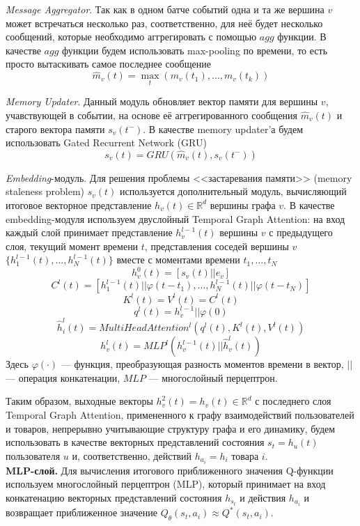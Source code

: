 \documentclass{mipt-thesis-ms}
\renewcommand{\phi}{\varphi}  %
\begin{document}
{\it Message Aggregator}. Так как в одном батче событий одна и та же вершина $v$ может встречаться несколько раз, соответственно, для неё будет несколько сообщений, которые необходимо аггрегировать с помощью $agg$ функции. В качестве $agg$ функции будем использовать max-pooling по времени, то есть просто вытаскивать самое последнее сообщение
$$\hat m_v(t) = \max_t(m_v(t_1), \dots, m_v(t_k))$$

{\it Memory Updater}. Данный модуль обновляет вектор памяти для вершины $v$, учавствующей в событии, на основе её аггрегированного сообщения $\hat m_v(t)$ и старого вектора памяти $s_v(t^-)$. В качестве memory updater'а будем использовать Gated Recurrent Network (GRU)
$$s_v(t) = GRU(\hat m_v(t), s_v(t^-))$$

{\it Embedding}-модуль. Для решения проблемы <<застаревания памяти>> (memory staleness problem) $s_v(t)$ используется дополнительный модуль, вычисляющий итоговое векторное представление $h_v(t) \in \mathbb{R}^d$ вершины графа $v$. В качестве embedding-модуля используем двуслойный Temporal Graph Attention: на вход каждый слой принимает представление $h_v^{l-1}(t)$ вершины $v$ с предыдущего слоя, текущий момент времени $t$, представления соседей вершины $v$ $\{h_1^{l-1}(t), \dots, h_N^{l-1}(t)\}$ вместе с моментами времени $t_1, \dots, t_N$
$$h_v^0(t) = [s_v(t) || e_v]$$
$$C^l(t) = [h_1^{l-1}(t)||\phi(t - t_1), \dots, h_N^{l-1}(t)||\phi(t - t_N)]$$
$$K^l(t) = V^l(t) = C^l(t)$$
$$q^l(t) = h_v^{l-1} || \phi(0)$$
$$\hat h_i^l(t) = MultiHeadAttention^l(q^l(t), K^l(t), V^l(t))$$
$$h_v^l(t) = MLP^l(h_v^{l-1}(t) || \hat h_v^l(t))$$
Здесь $\phi(\cdot)$ --- функция, преобразующая разность моментов времени в вектор, $||$ --- операция конкатенации, $MLP$ --- многослойный перцептрон.

Таким образом, выходные векторы $h_v^2(t) = h_v(t) \in \mathbb{R}^d$ с последнего слоя Temporal Graph Attention, примененного к графу взаимодействий пользователей и товаров, непрерывно учитывающие структуру графа и его динамику, будем использовать в качестве векторных представлений состояния $s_t = h_u(t)$ пользователя $u$ и, соответственно, действий $h_{a_i} = h_i$ товара $i$.\\

{\bf MLP-слой.} Для вычисления итогового приближенного значения Q-функции используем многослойный перцептрон (MLP), который принимает на вход конкатенацию векторных представлений состояния $h_{s_t}$ и действия $h_{a_i}$ и возвращает приближенное значение $Q_{\theta}(s_t, a_i) \approx Q^*(s_t, a_i)$.\\
\end{document}
